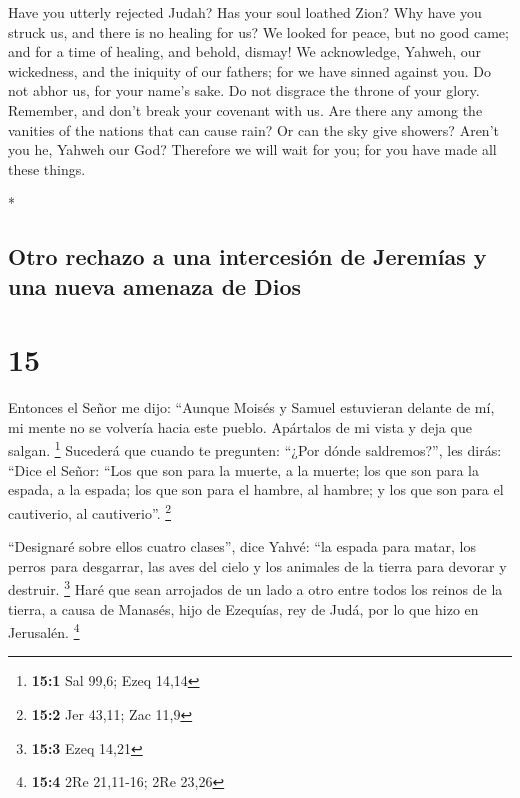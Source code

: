 \begin{paracol}{2}
\begin{otherlanguage}{english}
 Have you utterly rejected Judah? Has your soul loathed
Zion? Why have you struck us, and there is no healing for us? We looked
for peace, but no good came; and for a time of healing, and behold,
dismay!  We acknowledge, Yahweh, our wickedness, and the
iniquity of our fathers; for we have sinned against you. 
Do not abhor us, for your name's sake. Do not disgrace the throne of
your glory. Remember, and don't break your covenant with us.
 Are there any among the vanities of the nations that can
cause rain? Or can the sky give showers? Aren't you he, Yahweh our God?
Therefore we will wait for you; for you have made all these things.

\end{otherlanguage}

\switchcolumn[0]*

\hypertarget{otro-rechazo-a-una-intercesiuxf3n-de-jeremuxedas-y-una-nueva-amenaza-de-dios}{%
\subsection{Otro rechazo a una intercesión de Jeremías y una nueva
amenaza de
Dios}\label{otro-rechazo-a-una-intercesiuxf3n-de-jeremuxedas-y-una-nueva-amenaza-de-dios}}

\hypertarget{section-28}{%
\section{15}\label{section-28}}

 Entonces el Señor me dijo: ``Aunque Moisés y Samuel
estuvieran delante de mí, mi mente no se volvería hacia este pueblo.
Apártalos de mi vista y deja que salgan. \footnote{\textbf{15:1} Sal
  99,6; Ezeq 14,14}  Sucederá que cuando te pregunten:
``¿Por dónde saldremos?'', les dirás: ``Dice el Señor: ``Los que son
para la muerte, a la muerte; los que son para la espada, a la espada;
los que son para el hambre, al hambre; y los que son para el cautiverio,
al cautiverio''. \footnote{\textbf{15:2} Jer 43,11; Zac 11,9}

 ``Designaré sobre ellos cuatro clases'', dice Yahvé: ``la
espada para matar, los perros para desgarrar, las aves del cielo y los
animales de la tierra para devorar y destruir. \footnote{\textbf{15:3}
  Ezeq 14,21}  Haré que sean arrojados de un lado a otro
entre todos los reinos de la tierra, a causa de Manasés, hijo de
Ezequías, rey de Judá, por lo que hizo en Jerusalén. \footnote{\textbf{15:4}
  2Re 21,11-16; 2Re 23,26}


\end{paracol}
